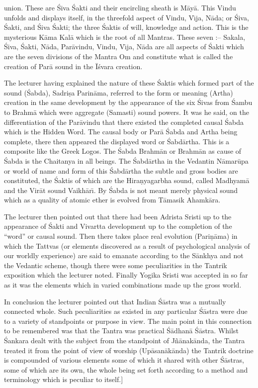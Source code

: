 union. These are \'Siva \'Sakti and their encircling sheath is M\=ay\=a. This Vindu unfolds and displays itself, in the threefold aspect of Vindu, V\={\i}ja, N\=ada; or \'Siva, \'Sakti, and \'Siva \'Sakti; the three \'Saktis of will, knowledge and action. This is the mysterious K\=ama Kal\=a which is the root of all Mantras. These seven :-- Sakala, \'Siva, \'Sakti, N\=ada, Par\=avindu, Vindu, V\={\i}ja, N\=ada are all aspects of \'Sakti which are the seven divisions of the Mantra Om and constitute what is called the creation of Par\=a sound in the \=I\'svara creation.

The lecturer having explained the nature of these \'Saktis which formed part of the sound (\'Sabda), Sadri\d{s}a Parin\=ama, referred to the form or meaning (Artha) creation in the same development by the appearance of the six \'Sivas from \'Sambu to Brahm\=a which were aggregate (Samasti) sound powers. It was he said, on the differentiation of the Par\=avindu that there existed the completed causal \'Sabda which is the Hidden Word. The causal body or Par\=a \'Sabda and Artha being complete, there then appeared the displayed word or \'Sabd\=artha. This is a composite like the Greek Logos. The \'Sabda Brahm\=an or Brahm\=an as cause of \'Sabda is the Chaitanya in all beings. The \'Sabd\=artha in the Vedantin N\=amar\=upa or world of name and form of this \'Sabd\=artha the subtle and gross bodies are constituted, the \'Saktis of which are the Hira\d{n}yagarbha sound, called Madhyam\=a and the Vir\=at sound Vaikh\=ar\={\i}. By \'Sabda is not meant merely physical sound which as a quality of atomic ether is evolved from T\=amasik Ahamk\=ara.

The lecturer then pointed out that there had been Adrista Sristi up to the appearance of \'Sakti and Vivartta development up to the completion of the ``word'' or causal sound. Then there takes place real evolution (Pari\d{n}\=ama) in which the Tattvas (or elements discovered as a result of psychological analysis of our worldly experience) are said to emanate according to the S\=ankhya and not the Vedantic scheme, though there were some peculiarities in the Tantrik exposition which the lecturer noted. Finally Yogika Sristi was accepted in so far as it was the elements which in varied combinations made up the gross world.

In conclusion the lecturer pointed out that Indian \'S\=astra was a mutually connected whole. Such peculiarities as existed in any particular \'S\=astra were due to a variety of standpoints or purpose in view. The main point in this connection to be remembered was that the Tantra was practical \'S\=adhan\=a \'S\=astra. Whilst \'Sankara dealt with the subject from the standpoint of J\~n\=anak\=anda, the Tantra treated it from the point of view of worship (Up\=asan\=ak\=anda) the Tantrik doctrine is compounded of various elements some of which it shared with other \'S\=astras, some of which are its own, the whole being set forth according to a method and terminology which is peculiar to itself.]

